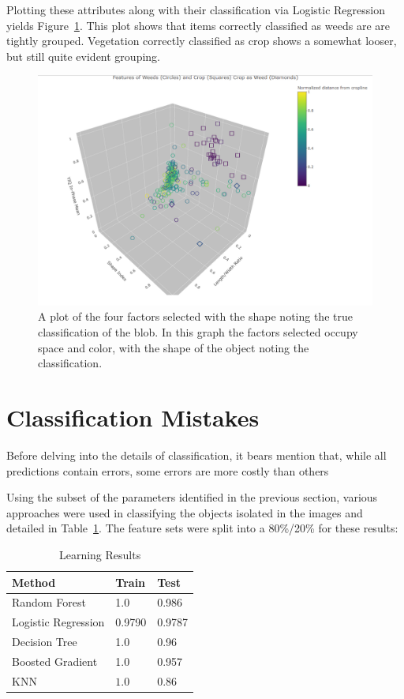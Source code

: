 \documentclass[letterpaper]{article}
\begin{document}
{Plotting these attributes along with their classification via Logistic Regression yields Figure~\ref{fig:factors}. This plot shows that items correctly classified as weeds are are tightly grouped. Vegetation correctly classified as crop shows a somewhat looser, but still quite evident grouping.
 \begin{figure}[H]
	\centering
	\includegraphics[width=0.9\linewidth]{./figures/plot-factors.png}
	\caption[Factors selected for discrimination]{A plot of the four factors selected with the shape noting the true classification of the blob. In this graph the factors selected occupy space and color, with the shape of the object noting the classification.}
	\label{fig:factors}
\end{figure}
  
\section{Classification Mistakes}
Before delving into the details of classification, it bears mention that, while all predictions contain errors, some errors are more costly than others

Using the subset of the parameters identified in the previous section, various approaches were used in classifying the objects isolated in the images and detailed in Table~\ref{fig:learning}. The feature sets were split into a 80\%/20\% for these results: 

{\renewcommand{\arraystretch}{2}%
\begin{table}[H]
	\centering
    \caption{Learning Results}
    \label{fig:learning}
    \begin{tabular}{  l  p{4cm}  p{5cm} }
        \toprule
\textbf{Method}      
& \textbf{Train}   
& \textbf{Test} \\\midrule
Random Forest      
& 1.0
& 0.986 \\\hline
Logistic Regression
& 0.9790       
& 0.9787 \\\hline
Decision Tree
& 1.0
& 0.96 \\\hline
Boosted Gradient     
& 1.0
& 0.957 \\\hline
KNN     
& $1.0$                    
& $0.86$ \\\hline
        \bottomrule
    \end{tabular}
\end{table}

}}
\end{document}
